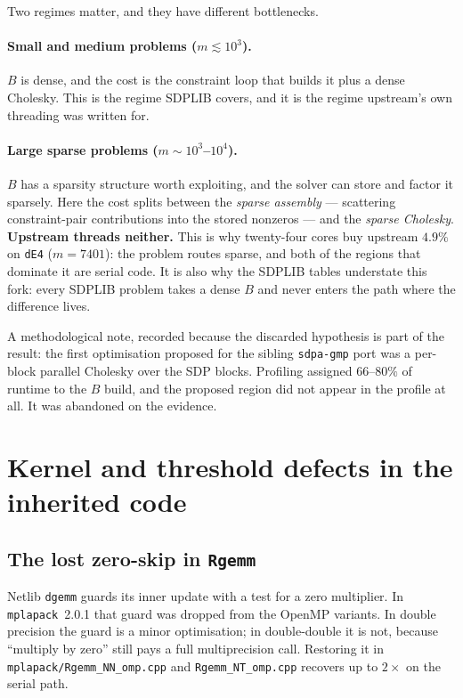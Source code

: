 \documentclass[11pt]{article}
\newcommand{\bMat}{B}
\newcommand{\code}[1]{\texttt{#1}}
\begin{document}
Two regimes matter, and they have different bottlenecks.

\paragraph{Small and medium problems ($m \lesssim 10^3$).} $\bMat$ is dense, and the cost is the
constraint loop that builds it plus a dense Cholesky. This is the regime SDPLIB covers, and it is
the regime upstream's own threading was written for.

\paragraph{Large sparse problems ($m \sim 10^3$--$10^4$).} $\bMat$ has a sparsity structure worth
exploiting, and the solver can store and factor it sparsely. Here the cost splits between the
\emph{sparse assembly} --- scattering constraint-pair contributions into the stored nonzeros ---
and the \emph{sparse Cholesky}. \textbf{Upstream threads neither.} This is why twenty-four cores
buy upstream $4.9\%$ on \code{dE4} ($m{=}7401$): the problem routes sparse, and both of the
regions that dominate it are serial code. It is also why the SDPLIB tables understate this fork:
every SDPLIB problem takes a dense $\bMat$ and never enters the path where the difference lives.

A methodological note, recorded because the discarded hypothesis is part of the result: the first
optimisation proposed for the sibling \code{sdpa-gmp} port was a per-block parallel Cholesky over
the SDP blocks. Profiling assigned $66$--$80\%$ of runtime to the $\bMat$ build, and the proposed
region did not appear in the profile at all. It was abandoned on the evidence.

\section{Kernel and threshold defects in the inherited code}

\subsection{The lost zero-skip in \code{Rgemm}}

Netlib \code{dgemm} guards its inner update with a test for a zero multiplier. In
\code{mplapack}~2.0.1 that guard was dropped from the OpenMP variants. In double precision the
guard is a minor optimisation; in double-double it is not, because ``multiply by zero'' still pays
a full multiprecision call. Restoring it in \code{mplapack/Rgemm\_NN\_omp.cpp} and
\code{Rgemm\_NT\_omp.cpp} recovers up to $2\times$ on the serial path.
\end{document}
